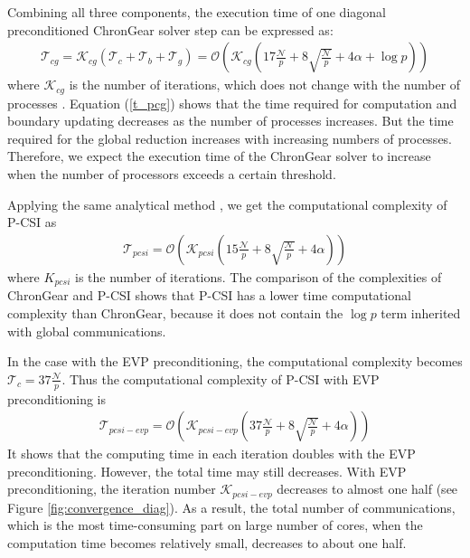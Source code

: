 Combining all three components, the execution time of one diagonal preconditioned ChronGear solver step can be expressed as:
\begin{eqnarray}
\label{t_pcg}
\mathcal{T}_{cg}=\mathcal{K}_{cg} (\mathcal{T}_c + \mathcal{T}_b+\mathcal{T}_g ) = \mathcal{O}(\mathcal{K}_{cg} (17\frac{\mathcal{N}}{p} +8\sqrt{\frac{\mathcal{N} }{p}}+ 4\alpha +\log p))
\end{eqnarray}
where $\mathcal{K}_{cg}$ is the number of iterations,
which does not change with the number of processes \citep{hu2013scalable}. Equation (\ref{t_pcg}) shows that the time required for computation and boundary updating decreases as the number of processes increases. But the time required for the global reduction increases with increasing numbers of processes. Therefore, we expect the execution time of the ChronGear solver to increase when the number of processors exceeds a certain threshold.

Applying the same analytical method , we get the computational complexity of P-CSI as
\begin{eqnarray}
\label{t_pcsi}
\mathcal{T}_{pcsi}=\mathcal{O}(\mathcal{K}_{pcsi} (15\frac{\mathcal{N}}{p} +8\sqrt{\frac{\mathcal{N} }{p}} + 4\alpha))
\end{eqnarray}
where $K_{pcsi}$ is the number of iterations. The comparison of the complexities of ChronGear and P-CSI shows that P-CSI has a lower time computational complexity than ChronGear, because it does not contain the $\log p$ term inherited with global communications.

In the case with the EVP preconditioning, the computational complexity becomes $\mathcal{T}_c = 37 \frac{\mathcal{N}}{p}$. Thus the computational complexity of P-CSI with EVP preconditioning is
\begin{eqnarray}
\label{t_pcsiEvp}
\mathcal{T}_{pcsi-evp}=\mathcal{O}(\mathcal{K}_{pcsi-evp} (37\frac{\mathcal{N}}{p} +8\sqrt{\frac{\mathcal{N} }{p}} + 4\alpha))
\end{eqnarray}
It shows that the computing time in each iteration doubles with the EVP preconditioning.
However, the total time may still decreases. With EVP preconditioning, the iteration number $\mathcal{K}_{pcsi-evp}$ decreases to almost one half (see Figure \ref{fig:convergence_diag}). As a result, the total number of communications, which is the most time-consuming part on large number of cores, when the computation time becomes relatively small, decreases to about one half.


